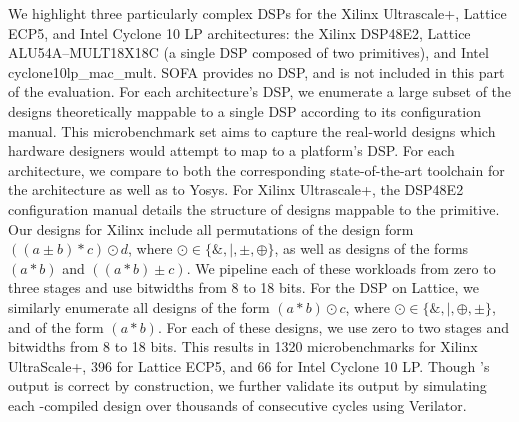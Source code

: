 We highlight three particularly complex
  DSPs for the Xilinx Ultrascale+,
  Lattice ECP5,
  and Intel Cyclone 10 LP architectures: 
  the Xilinx DSP48E2,
  Lattice ALU54A--MULT18X18C 
  (a single DSP composed of 
  two primitives),
  and Intel cyclone10lp\_mac\_mult.
SOFA provides no DSP, and is not included
  in this part of the evaluation.
For each architecture's DSP,
  we enumerate a large subset 
  of the designs
  theoretically mappable
  to a single DSP 
  according to its
  configuration manual.
This microbenchmark set
  aims to capture
  the real-world designs
  which hardware designers
  would attempt to map
  to a platform's DSP.
For each architecture, we compare \lr
  to both the corresponding
  state-of-the-art toolchain for
  the architecture 
  as well as to Yosys.
For Xilinx Ultrascale+, 
  the DSP48E2 configuration manual details the
  structure of designs mappable
  to the primitive.
Our designs for Xilinx include 
  all permutations of the design form
  $((a \pm b) * c) \odot d$,
  where $\odot \in \{\&, |, \pm, \oplus \}$,
  as well as designs of the forms $(a * b)$ and $((a * b) \pm c)$.
We pipeline each of these
  workloads from zero to three stages 
  and use bitwidths from 8 to 18 bits.
For the DSP on Lattice, we similarly enumerate
  all designs of the form $(a * b) \odot c$, 
  where $\odot \in \{\&, |, \oplus, \pm\}$, and of the form $(a * b)$.
For each of these designs, 
  we use zero to two stages
  and bitwidths from 8 to 18 bits.
This results in
    1320 microbenchmarks for Xilinx UltraScale+,
    396 for Lattice ECP5,
    and 66 for Intel Cyclone 10 LP.
Though \lr's output is correct by construction,
  we further validate its output
  by simulating each \lr-compiled design
  over thousands of consecutive cycles
  using Verilator.\tighten
  

